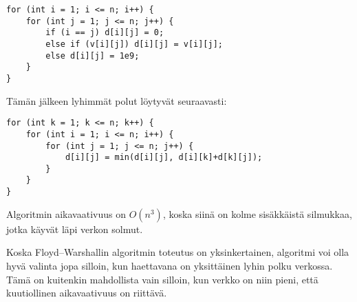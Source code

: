 \begin{lstlisting}
for (int i = 1; i <= n; i++) {
    for (int j = 1; j <= n; j++) {
        if (i == j) d[i][j] = 0;
        else if (v[i][j]) d[i][j] = v[i][j];
        else d[i][j] = 1e9;
    }
}
\end{lstlisting}

Tämän jälkeen lyhimmät polut löytyvät seuraavasti:

\begin{lstlisting}
for (int k = 1; k <= n; k++) {
    for (int i = 1; i <= n; i++) {
        for (int j = 1; j <= n; j++) {
            d[i][j] = min(d[i][j], d[i][k]+d[k][j]);
        }
    }
}
\end{lstlisting}

Algoritmin aikavaativuus on
$O(n^3)$, koska siinä on kolme sisäkkäistä
silmukkaa,
jotka käyvät läpi verkon solmut.

Koska Floyd–Warshallin
algoritmin toteutus on yksinkertainen,
algoritmi voi olla hyvä valinta jopa silloin,
kun haettavana on yksittäinen
lyhin polku verkossa.
Tämä on kuitenkin mahdollista vain silloin,
kun verkko on niin pieni,
että kuutiollinen aikavaativuus on riittävä.
